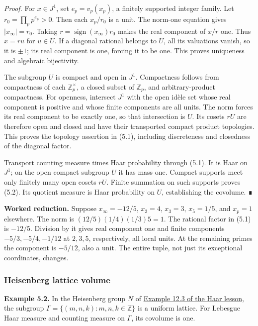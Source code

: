 \documentclass[
  english,
  11pt,
  a4paper,
]{article}
\begin{document}
\emph{Proof.} For \(x\in J^1\), set \(e_p=v_p(x_p)\), a finitely
supported integer family. Let \(r_0=\prod_p p^{e_p}>0\). Then each
\(x_p/r_0\) is a unit. The norm-one equation gives \(|x_\infty|=r_0\).
Taking \(r=\operatorname{sign}(x_\infty)r_0\) makes the real component
of \(x/r\) one. Thus \(x=ru\) for \(u\in U\). If a diagonal rational
belongs to \(U\), all its valuations vanish, so it is \(\pm1\); its real
component is one, forcing it to be one. This proves uniqueness and
algebraic bijectivity.

The subgroup \(U\) is compact and open in \(J^1\). Compactness follows
from compactness of each \(\mathbb Z_p^\times\), a closed subset of
\(\mathbb Z_p\), and arbitrary-product compactness. For openness,
intersect \(J^1\) with the open idèle set whose real component is
positive and whose finite components are all units. The norm forces its
real component to be exactly one, so that intersection is \(U\). Its
cosets \(rU\) are therefore open and closed and have their transported
compact product topologies. This proves the topology assertion in (5.1),
including discreteness and closedness of the diagonal factor.

Transport counting measure times Haar probability through (5.1). It is
Haar on \(J^1\); on the open compact subgroup \(U\) it has mass one.
Compact supports meet only finitely many open cosets \(rU\). Finite
summation on such supports proves (5.2). Its quotient measure is Haar
probability on \(U\), establishing the covolume. ∎

\textbf{Worked reduction.} Suppose \(x_\infty=-12/5\), \(x_2=4\),
\(x_3=3\), \(x_5=1/5\), and \(x_p=1\) elsewhere. The norm is
\((12/5)(1/4)(1/3)5=1\). The rational factor in (5.1) is \(-12/5\).
Division by it gives real component one and finite components
\(-5/3,-5/4,-1/12\) at \(2,3,5\), respectively, all local units. At the
remaining primes the component is \(-5/12\), also a unit. The entire
tuple, not just its exceptional coordinates, changes.

\subsubsection{Heisenberg lattice
volume}\label{finite-covolume-and-arithmetic-quotients--heisenberg-lattice-volume}

\textbf{Example 5.2.} In the Heisenberg group \(N\) of
\hyperref[haar-measure-on-locally-compact-groups--heisenberg-haar-volume]{Example
12.3 of the Haar lesson}, the subgroup
\(\Gamma=\{(m,n,k):m,n,k\in\mathbb Z\}\) is a uniform lattice. For
Lebesgue Haar measure and counting measure on \(\Gamma\), its covolume
is one.
\end{document}
